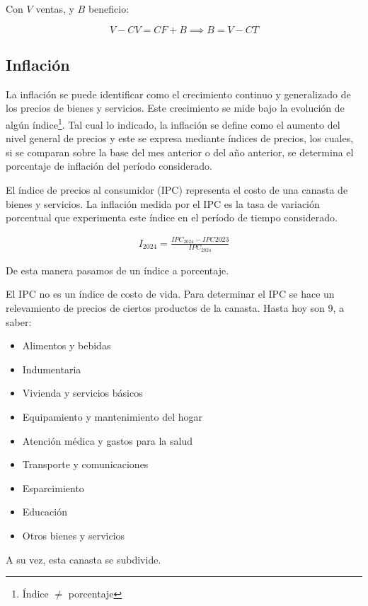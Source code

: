 Con \(V\) ventas, y \(B\) beneficio:

\begin{equation*}
    V - CV = CF + B \implies B = V - CT
\end{equation*}

\subsection{Inflación}

La inflación se puede identificar como el crecimiento continuo y generalizado de 
los precios de bienes y servicios.
Este crecimiento se mide bajo la evolución de algún índice\footnote{Índice \(\neq\) porcentaje}.
Tal cual lo indicado, 
la inflación se define como el aumento del nivel general de precios
y este se expresa mediante índices de precios, 
los cuales,
si se comparan sobre la base del mes anterior o del año anterior,
se determina el porcentaje de inflación del período considerado.

El índice de precios al consumidor (IPC) 
representa el costo de una canasta de bienes y servicios.
La inflación medida por el IPC es la tasa de variación porcentual 
que experimenta este índice en el período de tiempo considerado.

\begin{align*}
    I_{2024} = \frac{IPC_{2024}-IPC{2023}}{IPC_{2024}}
\end{align*}

De esta manera pasamos de un índice a porcentaje.

El IPC no es un índice de costo de vida.
Para determinar el IPC se hace un relevamiento de precios 
de ciertos productos de la canasta.
Hasta hoy son 9, a saber:
\begin{itemize}
    \item Alimentos y bebidas
    \item Indumentaria
    \item Vivienda y servicios básicos
    \item Equipamiento y mantenimiento del hogar
    \item Atención médica y gastos para la salud 
    \item Transporte y comunicaciones
    \item Esparcimiento
    \item Educación
    \item Otros bienes y servicios 
\end{itemize}

A su vez,
esta canasta se subdivide.